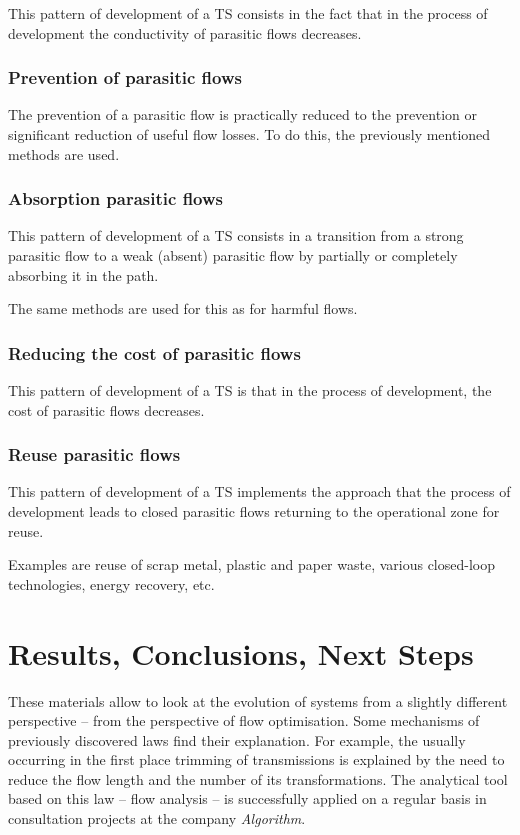 \documentclass[a4paper,11pt]{article}
\begin{document}
This pattern of development of a TS consists in the fact that in the process
of development the conductivity of parasitic flows decreases.

\subsubsection{Prevention of parasitic flows}

The prevention of a parasitic flow is practically reduced to the prevention or
significant reduction of useful flow losses. To do this, the previously
mentioned methods are used.

\subsubsection{Absorption parasitic flows}

This pattern of development of a TS consists in a transition from a strong
parasitic flow to a weak (absent) parasitic flow by partially or completely
absorbing it in the path.

The same methods are used for this as for harmful flows.

\subsubsection{Reducing the cost of parasitic flows}

This pattern of development of a TS is that in the process of development, the
cost of parasitic flows decreases.

\subsubsection{Reuse parasitic flows}

This pattern of development of a TS implements the approach that the process
of development leads to closed parasitic flows returning to the operational
zone for reuse.

Examples are reuse of scrap metal, plastic and paper waste, various
closed-loop technologies, energy recovery, etc.

\section*{Results, Conclusions, Next Steps}

These materials allow to look at the evolution of systems from a slightly
different perspective -- from the perspective of flow optimisation. Some
mechanisms of previously discovered laws find their explanation. For example,
the usually occurring in the first place trimming of transmissions is
explained by the need to reduce the flow length and the number of its
transformations. The analytical tool based on this law -- flow analysis -- is
successfully applied on a regular basis in consultation projects at the
company \emph{Algorithm}.
\end{document}
